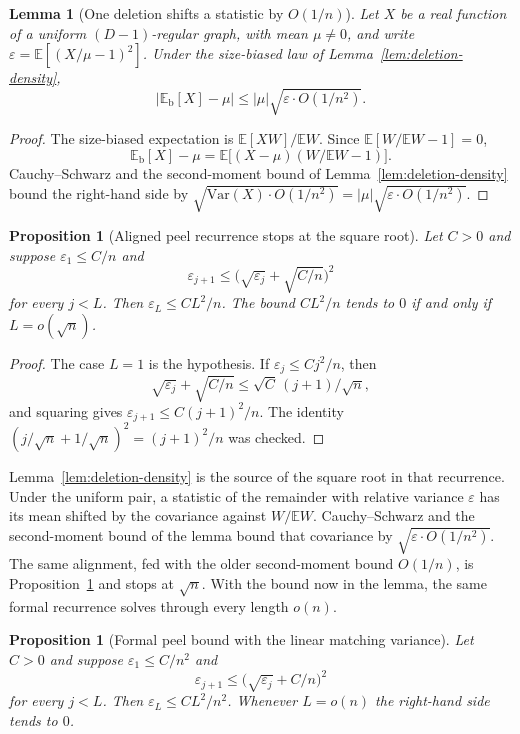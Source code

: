 \documentclass[11pt]{article}
\newtheorem{lemma}[theorem]{Lemma}
\newtheorem{proposition}[theorem]{Proposition}
\newcommand{\EE}{\mathbb{E}}
\newcommand{\Var}{\mathrm{Var}}
\begin{document}
\begin{lemma}[One deletion shifts a statistic by \(O(1/n)\)]
\label{lem:size-bias-shift}
Let \(X\) be a real function of a uniform \((D-1)\)-regular graph, with mean
\(\mu\neq 0\), and write
\(\varepsilon=\EE[(X/\mu-1)^2]\).
Under the size-biased law of Lemma~\ref{lem:deletion-density},
\[
\bigl|\EE_{\mathrm{b}}[X]-\mu\bigr|
\le
|\mu|\sqrt{\varepsilon\cdot O(1/n^2)}.
\]
\end{lemma}

\begin{proof}
The size-biased expectation is \(\EE[XW]/\EE W\).
Since \(\EE[W/\EE W-1]=0\),
\[
\EE_{\mathrm{b}}[X]-\mu
=
\EE\bigl[(X-\mu)(W/\EE W-1)\bigr].
\]
Cauchy--Schwarz and the second-moment bound of
Lemma~\ref{lem:deletion-density} bound the right-hand side by
\(\sqrt{\Var(X)\cdot O(1/n^2)}=|\mu|\sqrt{\varepsilon\cdot O(1/n^2)}\).
\end{proof}

\begin{proposition}[Aligned peel recurrence stops at the square root]
\label{prop:aligned-peel}
Let \(C>0\) and suppose \(\varepsilon_1\le C/n\) and
\[
\varepsilon_{j+1}
\le
\bigl(\sqrt{\varepsilon_j}+\sqrt{C/n}\bigr)^2
\]
for every \(j<L\).
Then \(\varepsilon_L\le C L^2/n\).
The bound \(C L^2/n\) tends to \(0\) if and only if \(L=o(\sqrt{n})\).
\end{proposition}

\begin{proof}
The case \(L=1\) is the hypothesis.
If \(\varepsilon_j\le C j^2/n\), then
\[
\sqrt{\varepsilon_j}+\sqrt{C/n}
\le
\sqrt{C}\,(j+1)/\sqrt{n},
\]
and squaring gives \(\varepsilon_{j+1}\le C(j+1)^2/n\).
The identity
\((j/\sqrt{n}+1/\sqrt{n})^2=(j+1)^2/n\) was checked.
\end{proof}

Lemma~\ref{lem:deletion-density} is the source of the square root in that
recurrence.
Under the uniform pair, a statistic of the remainder with relative variance
\(\varepsilon\) has its mean shifted by the covariance against \(W/\EE W\).
Cauchy--Schwarz and the second-moment bound of the lemma bound that
covariance by \(\sqrt{\varepsilon\cdot O(1/n^2)}\).
The same alignment, fed with the older second-moment bound \(O(1/n)\), is
Proposition~\ref{prop:aligned-peel} and stops at \(\sqrt{n}\).
With the bound now in the lemma, the same formal recurrence solves through
every length \(o(n)\).

\begin{proposition}[Formal peel bound with the linear matching variance]
\label{prop:aligned-peel-square}
Let \(C>0\) and suppose \(\varepsilon_1\le C/n^2\) and
\[
\varepsilon_{j+1}
\le
\bigl(\sqrt{\varepsilon_j}+C/n\bigr)^2
\]
for every \(j<L\).
Then \(\varepsilon_L\le C L^2/n^2\).
Whenever \(L=o(n)\) the right-hand side tends to \(0\).
\end{proposition}
\end{document}
